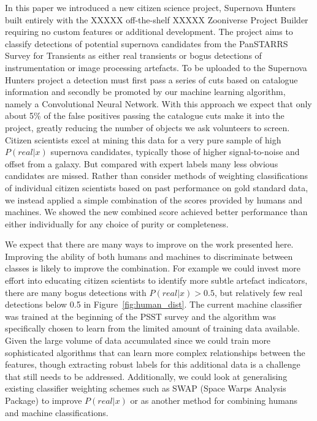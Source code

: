 \documentclass[a4paper,fleqn,usenatbib]{mnras}
\begin{document}
In this paper we introduced a new citizen science project, Supernova Hunters built entirely with the XXXXX off-the-shelf XXXXX Zooniverse Project Builder requiring no custom features or additional development.  The project aims to classify detections of potential supernova candidates from the PanSTARRS Survey for Transients  as either real transients or bogus detections of instrumentation or image processing artefacts.  To be uploaded to the Supernova Hunters project a detection must first pass a series of cuts based on catalogue information and secondly be promoted by our machine learning algorithm, namely a Convolutional Neural Network. With this approach we expect that only about 5\% of the false positives passing the catalogue cuts make it into the project, greatly reducing the number of objects we ask volunteers to screen.  Citizen scientists excel at mining this data for a very pure sample of high $P(real|x)$ supernova candidates, typically those of higher signal-to-noise and offset from a galaxy.  But compared with expert labels many less obvious candidates are missed.  Rather than consider methods of weighting classifications of individual citizen scientists based on past performance on  gold standard data, we instead applied a simple combination of the scores provided by humans and machines.  We showed the new combined score achieved better performance than either individually for any choice of purity or completeness.

We expect that there are many ways to improve on the work presented here.  Improving the ability of both humans and machines
to discriminate between classes is likely to improve the combination.  For example we could invest more effort into educating citizen scientists to identify more subtle artefact indicators, there are many bogus detections with $P(real|x)>0.5$, but relatively few real detections below 0.5 in Figure~\ref{fig:human_dist}.  The current machine classifier was trained at the beginning of the PSST survey and the algorithm was specifically chosen to learn from the limited amount of training data available.  Given the large volume of data accumulated since we could train more sophisticated algorithms that can learn more complex relationships between the features, though extracting robust labels for this additional data is a challenge that still needs to be addressed.  Additionally, we could look at generalising existing classifier weighting schemes such as SWAP (Space Warps Analysis Package) \citep{Marshall16} to improve $P(real|x)$ or as another method for combining humans and machine classifications.
\end{document}
